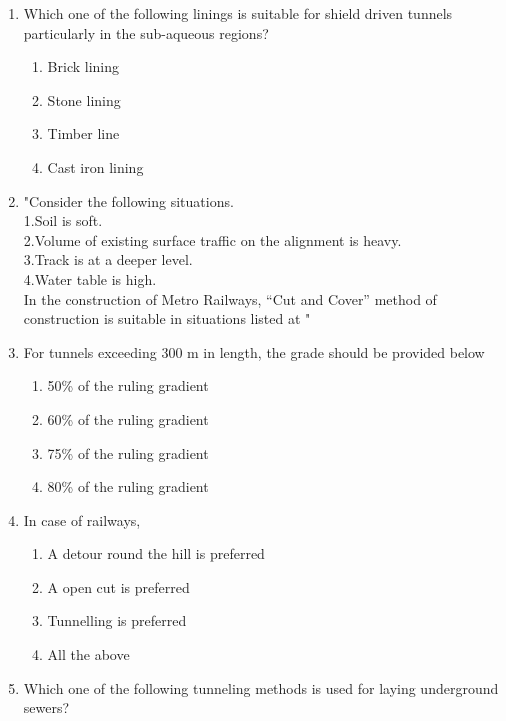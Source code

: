 \documentclass[11pt,a4paper]{article}
\begin{document}
\begin{enumerate}
\item{Which one of the following linings is suitable for shield driven tunnels particularly in the sub-aqueous regions?}
\begin{enumerate}[label=\Alph*.]
\item{Brick lining}
\item{Stone lining}
\item{Timber line}
\item{Cast iron lining}
\end{enumerate}
\item{"Consider the following situations. \\
1.Soil is soft. \\
2.Volume of existing surface traffic on the alignment is heavy. \\
3.Track is at a deeper level. \\
4.Water table is high. \\
In the construction of Metro Railways, ``Cut and Cover'' method of construction is suitable in situations listed at
"
}
\\
\item{For tunnels exceeding 300 m in length, the grade should be provided below}
\begin{enumerate}[label=\Alph*.]
\item{50\% of the ruling gradient}
\item{60\% of the ruling gradient}
\item{75\% of the ruling gradient}
\item{80\% of the ruling gradient}
\end{enumerate}
\item{In case of railways,}
\begin{enumerate}[label=\Alph*.]
\item{A detour round the hill is preferred}
\item{A open cut is preferred}
\item{Tunnelling is preferred}
\item{All the above}
\end{enumerate}
\item{Which one of the following tunneling methods is used for laying underground sewers?}

\end{enumerate}
\end{document}
